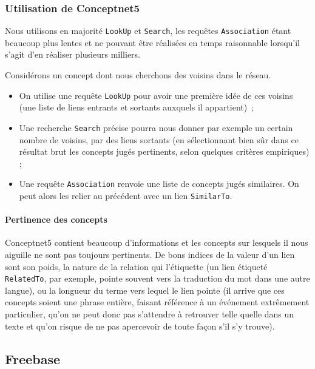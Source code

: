 \documentclass[a4paper, 12pt]{article}
\begin{document}
\subsubsection{Utilisation de Conceptnet5}

Nous utilisons en majorité \texttt{LookUp} et \texttt{Search}, les requêtes \texttt{Association} étant beaucoup plus lentes et ne pouvant être réalisées en temps raisonnable lorsqu'il s'agit d'en réaliser plusieurs milliers.

Considérons un concept dont nous cherchons des voisins dans le réseau.
\begin{itemize}
 \item On utilise une requête \verb|LookUp| pour avoir une première idée de ces voisins (une liste de liens entrants et sortants auxquels il appartient)~;
 \item Une recherche \verb|Search| précise pourra nous donner par exemple un certain nombre de voisins, par des liens sortants (en sélectionnant bien sûr dans ce résultat brut les concepts jugés pertinents, selon quelques critères empiriques) ;
 \item Une requête \verb|Association| renvoie une liste de concepts jugés similaires. On peut alors les relier au précédent avec un lien \verb|SimilarTo|.
\end{itemize}

\paragraph{Pertinence des concepts}
Conceptnet5 contient beaucoup d'informations et les concepts sur lesquels il nous aiguille ne sont pas toujours pertinents. De bons indices de la valeur d'un lien sont son poids, la nature de la relation qui l'étiquette (un lien étiqueté \verb|RelatedTo|, par exemple, pointe souvent vers la traduction du mot dans une autre langue), ou la longueur du terme vers lequel le lien pointe (il arrive que ces concepts soient une phrase entière, faisant référence à un événement extrêmement particulier, qu'on ne peut donc pas s'attendre à retrouver telle quelle dans un texte et qu'on risque de ne pas apercevoir de toute façon s'il s'y trouve).


\subsection{Freebase}\label{Subsection:Freebase}
\end{document}

